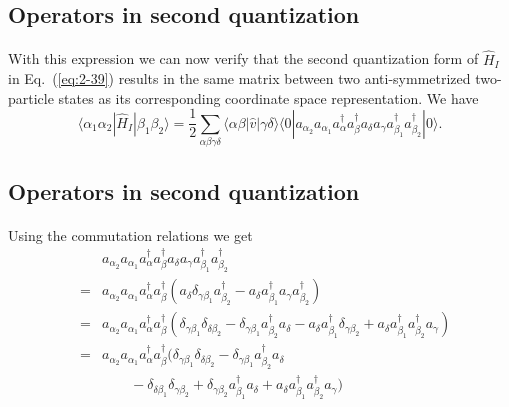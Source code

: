 \documentclass[%
twoside,                 %
final,                   %
10pt]{article}
\begin{document}
\subsection*{Operators in second quantization}

\paragraph{}
With this expression we can now verify that the second quantization form of $\hat{H}_I$ in Eq.~(\ref{eq:2-39}) 
results in the same matrix between two anti-symmetrized two-particle states as its corresponding coordinate
space representation. We have  
\begin{equation}
	\langle \alpha_1 \alpha_2|\hat{H}_I|\beta_1 \beta_2\rangle =
		\frac{1}{2} \sum_{\alpha\beta\gamma\delta}
			\langle \alpha\beta|\hat{v}|\gamma\delta\rangle \langle 0|a_{\alpha_2} a_{\alpha_1} 
			 a^{\dagger}_\alpha a^{\dagger}_\beta a_\delta a_\gamma 
			 a_{\beta_1}^{\dagger} a_{\beta_2}^{\dagger}|0\rangle. \label{eq:2-40}
\end{equation}




\subsection*{Operators in second quantization}

\paragraph{}
Using the commutation relations we get 
\begin{eqnarray}
	&& a_{\alpha_2} a_{\alpha_1}a^{\dagger}_\alpha a^{\dagger}_\beta 
		a_\delta a_\gamma a_{\beta_1}^{\dagger} a_{\beta_2}^{\dagger} \nonumber \\
	&=& a_{\alpha_2} a_{\alpha_1}a^{\dagger}_\alpha a^{\dagger}_\beta 
		( a_\delta \delta_{\gamma \beta_1} a_{\beta_2}^{\dagger} - 
		a_\delta  a_{\beta_1}^{\dagger} a_\gamma a_{\beta_2}^{\dagger} ) \nonumber \\
	&=& a_{\alpha_2} a_{\alpha_1}a^{\dagger}_\alpha a^{\dagger}_\beta 
		(\delta_{\gamma \beta_1} \delta_{\delta \beta_2} - \delta_{\gamma \beta_1} a_{\beta_2}^{\dagger} a_\delta -
		a_\delta a_{\beta_1}^{\dagger}\delta_{\gamma \beta_2} +
		a_\delta a_{\beta_1}^{\dagger} a_{\beta_2}^{\dagger} a_\gamma ) \nonumber \\
	&=& a_{\alpha_2} a_{\alpha_1}a^{\dagger}_\alpha a^{\dagger}_\beta 
		(\delta_{\gamma \beta_1} \delta_{\delta \beta_2} - \delta_{\gamma \beta_1} a_{\beta_2}^{\dagger} a_\delta \nonumber \\
		&& \qquad - \delta_{\delta \beta_1} \delta_{\gamma \beta_2} + \delta_{\gamma \beta_2} a_{\beta_1}^{\dagger} a_\delta
		+ a_\delta a_{\beta_1}^{\dagger} a_{\beta_2}^{\dagger} a_\gamma ) \label{eq:2-41}
\end{eqnarray}
\end{document}
